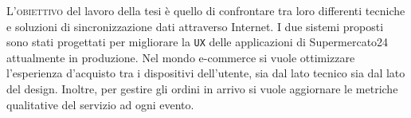 \lettrine{L'}{obiettivo} del lavoro della tesi è quello di confrontare tra loro differenti tecniche e soluzioni di sincronizzazione dati attraverso Internet.
I due sistemi proposti sono stati progettati per migliorare la \verb+UX+ delle applicazioni di Supermercato24 attualmente in produzione.
Nel mondo e-commerce si vuole ottimizzare l'esperienza d'acquisto tra i dispositivi dell'utente, sia dal lato tecnico sia dal lato del design.
Inoltre, per gestire gli ordini in arrivo si vuole aggiornare le metriche qualitative del servizio ad ogni evento.
